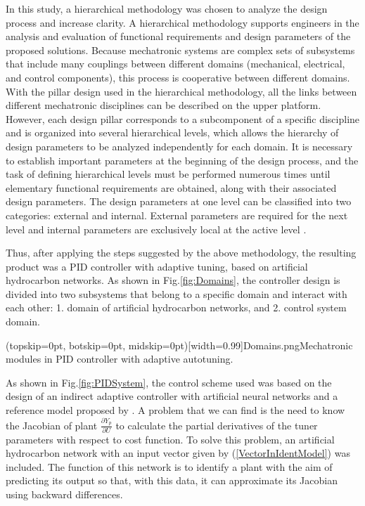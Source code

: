 \documentclass{ieeeaccess}
\begin{document}
In this study, a hierarchical methodology was chosen to analyze the design process and increase clarity. A hierarchical methodology supports engineers in the analysis and evaluation of functional requirements and design parameters of the proposed solutions. Because mechatronic systems are complex sets of subsystems that include many couplings between different domains (mechanical, electrical, and control components), this process is cooperative between different domains. With the pillar design used in the hierarchical methodology, all the links between different mechatronic disciplines can be described on the upper platform. However, each design pillar corresponds to a subcomponent of a specific discipline and is organized into several hierarchical levels, which allows the hierarchy of design parameters to be analyzed independently for each domain. It is necessary to establish important parameters at the beginning of the design process, and the task of defining hierarchical levels must be performed numerous times until elementary functional requirements are obtained, along with their associated design parameters. The design parameters at one level can be classified into two categories: external and internal. External parameters are required for the next level and internal parameters are exclusively local at the active level \cite{hehenberger_hierarchical_2010}.

Thus, after applying the steps suggested by the above methodology, the resulting product was a PID controller with adaptive tuning, based on artificial hydrocarbon networks. As shown in Fig.\ref{fig:Domains}, the controller design is divided into two subsystems that belong to a specific domain and interact with each other: 1. domain of artificial hydrocarbon networks, and  2. control system domain.

\Figure[ht!](topskip=0pt, botskip=0pt, midskip=0pt)[width=0.99\columnwidth]{Domains.png}{Mechatronic modules in PID controller with adaptive autotuning\label{fig:Domains}.}

As shown in Fig.\ref{fig:PIDSystem}, the control scheme used was based on the design of an indirect adaptive controller with artificial neural networks and a reference model proposed by \cite{narendra_identification_1990}. A problem that we can find is the need to know the Jacobian of plant \(\frac{\partial Y_p}{\partial U}\) to calculate the partial derivatives of the tuner parameters with respect to cost function. To solve this problem, an artificial hydrocarbon network with an input vector given by (\ref{VectorInIdentModel}) was included. The function of this network is to identify a plant with the aim of predicting its output so that, with this data, it can approximate its Jacobian using backward differences.
\end{document}
